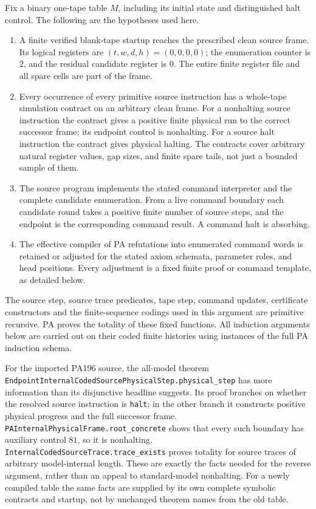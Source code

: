 Fix a binary one-tape table $M$, including its initial state and distinguished
halt control.  The following are the hypotheses used here.
\begin{enumerate}
\item A finite verified blank-tape startup reaches the prescribed clean
source frame.  Its logical registers are
$(t,w,d,h)=(0,0,0,0)$; the enumeration counter is $2$, and the residual
candidate register is $0$.  The entire finite register file and all spare
cells are part of the frame.
\item Every occurrence of every primitive source instruction has a
whole-tape simulation contract on an arbitrary clean frame.  For a
nonhalting source instruction the contract gives a positive finite physical
run to the correct successor frame; its endpoint control is nonhalting.
For a source halt instruction the contract gives physical halting.  The
contracts cover arbitrary natural register values, gap sizes, and finite
spare tails, not just a bounded sample of them.
\item The source program implements the stated command interpreter and
the complete candidate enumeration.  From a live command boundary each
candidate round takes a positive finite number of source steps, and the
endpoint is the corresponding command result.  A command halt is absorbing.
\item The effective compiler of PA refutations into enumerated command
words is retained or adjusted for the stated axiom schemata, parameter
roles, and head positions.  Every adjustment is a fixed finite proof or
command template, as detailed below.
\end{enumerate}
The source step, source trace predicates, tape step, command updates,
certificate constructors and the finite-sequence codings used in this
argument are primitive recursive.  PA proves the totality of these fixed
functions.  All induction arguments below are carried out on their coded
finite histories using instances of the full PA induction schema.

For the imported PA196 source, the all-model theorem
\texttt{EndpointInternalCodedSourcePhysicalStep.physical\_step} has more
information than its disjunctive headline suggests.  Its proof branches on
whether the resolved source instruction is \texttt{halt}; in the other
branch it constructs positive physical progress and the full successor
frame.  \texttt{PAInternalPhysicalFrame.root\_concrete} shows that every
such boundary has auxiliary control $81$, so it is nonhalting.
\texttt{InternalCodedSourceTrace.trace\_exists} proves totality for source
traces of arbitrary model-internal length.  These are exactly the facts
needed for the reverse argument, rather than an appeal to standard-model
nonhalting.  For a newly compiled table the same facts are supplied by its
own complete symbolic contracts and startup, not by unchanged theorem
names from the old table.

